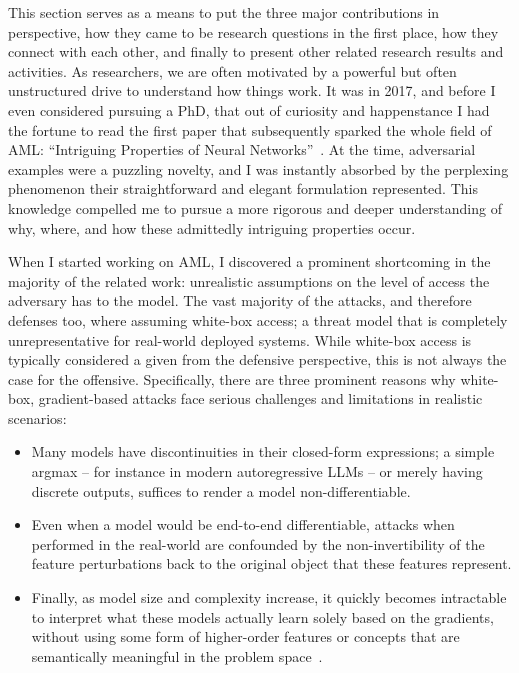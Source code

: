 This section serves as a means to put the three major contributions in perspective, how they came to be research questions in the first place, how they connect with each other, and finally to present other related research results and activities.
As researchers, we are often motivated by a powerful but often unstructured drive to understand how things work.
It was in 2017, and before I even considered pursuing a PhD, that out of curiosity and happenstance I had the fortune to read the first paper that subsequently sparked the whole field of \gls{AML}: ``Intriguing Properties of Neural Networks''~\cite{szegedy2013intriguing}.
At the time, adversarial examples were a puzzling novelty, and I was instantly absorbed by the perplexing phenomenon their straightforward and elegant formulation represented.
This knowledge compelled me to pursue a more rigorous and deeper understanding of why, where, and how these admittedly intriguing properties occur.

When I started working on \gls{AML}, I discovered a prominent shortcoming in the majority of the related work: unrealistic assumptions on the level of access the adversary has to the model.
The vast majority of the attacks, and therefore defenses too, where assuming white-box access; a threat model that is completely unrepresentative for real-world deployed systems.
While white-box access is typically considered a given from the defensive perspective, this is not always the case for the offensive. Specifically, there are three prominent reasons why white-box, gradient-based attacks face serious challenges and limitations in realistic scenarios:

\begin{itemize}
    \item Many models have discontinuities in their closed-form expressions; a simple argmax -- for instance in modern autoregressive LLMs -- or merely having discrete outputs, suffices to render a model non-differentiable.
    \item Even when a model would be end-to-end differentiable, attacks when performed in the real-world are confounded by the non-invertibility of the feature perturbations back to the original object that these features represent.
    \item Finally, as model size and complexity increase, it quickly becomes intractable to interpret what these models actually learn solely based on the gradients, without using some form of higher-order features or concepts that are semantically meaningful in the problem space~\cite{kim2018interpretability}.
\end{itemize}

